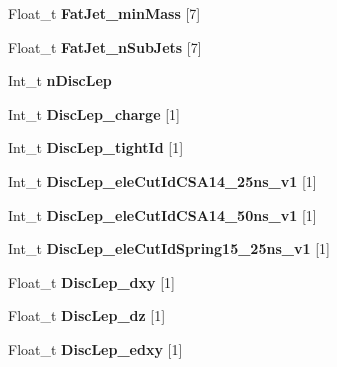 \begin{DoxyCompactItemize}
\item 
\hypertarget{classMiniTree_aec3ee6ef1b918c09efca6d8c4109e689}{}\label{classMiniTree_aec3ee6ef1b918c09efca6d8c4109e689} 
Float\+\_\+t {\bfseries Fat\+Jet\+\_\+min\+Mass} \mbox{[}7\mbox{]}
\item 
\hypertarget{classMiniTree_a91a8f132559198dd2bebf83e5375f74e}{}\label{classMiniTree_a91a8f132559198dd2bebf83e5375f74e} 
Float\+\_\+t {\bfseries Fat\+Jet\+\_\+n\+Sub\+Jets} \mbox{[}7\mbox{]}
\item 
\hypertarget{classMiniTree_ae53bcce460683fbea315c921c406cf20}{}\label{classMiniTree_ae53bcce460683fbea315c921c406cf20} 
Int\+\_\+t {\bfseries n\+Disc\+Lep}
\item 
\hypertarget{classMiniTree_aa75de1036cc5169cd863951a0d14f6b1}{}\label{classMiniTree_aa75de1036cc5169cd863951a0d14f6b1} 
Int\+\_\+t {\bfseries Disc\+Lep\+\_\+charge} \mbox{[}1\mbox{]}
\item 
\hypertarget{classMiniTree_a6d3ac314e8e45330fda3ad611f99657e}{}\label{classMiniTree_a6d3ac314e8e45330fda3ad611f99657e} 
Int\+\_\+t {\bfseries Disc\+Lep\+\_\+tight\+Id} \mbox{[}1\mbox{]}
\item 
\hypertarget{classMiniTree_a1526fb984f752b892240eba71ca71c19}{}\label{classMiniTree_a1526fb984f752b892240eba71ca71c19} 
Int\+\_\+t {\bfseries Disc\+Lep\+\_\+ele\+Cut\+Id\+C\+S\+A14\+\_\+25ns\+\_\+v1} \mbox{[}1\mbox{]}
\item 
\hypertarget{classMiniTree_a1bf9b2363a62e48194d76ed4f294b653}{}\label{classMiniTree_a1bf9b2363a62e48194d76ed4f294b653} 
Int\+\_\+t {\bfseries Disc\+Lep\+\_\+ele\+Cut\+Id\+C\+S\+A14\+\_\+50ns\+\_\+v1} \mbox{[}1\mbox{]}
\item 
\hypertarget{classMiniTree_a44b52053a4a8a64e7743fc4fea5e8c53}{}\label{classMiniTree_a44b52053a4a8a64e7743fc4fea5e8c53} 
Int\+\_\+t {\bfseries Disc\+Lep\+\_\+ele\+Cut\+Id\+Spring15\+\_\+25ns\+\_\+v1} \mbox{[}1\mbox{]}
\item 
\hypertarget{classMiniTree_ab81d0c24c1d4a6a9c24ef799b868b965}{}\label{classMiniTree_ab81d0c24c1d4a6a9c24ef799b868b965} 
Float\+\_\+t {\bfseries Disc\+Lep\+\_\+dxy} \mbox{[}1\mbox{]}
\item 
\hypertarget{classMiniTree_a48304d654d38f6fd9ab572ae630fde3d}{}\label{classMiniTree_a48304d654d38f6fd9ab572ae630fde3d} 
Float\+\_\+t {\bfseries Disc\+Lep\+\_\+dz} \mbox{[}1\mbox{]}
\item 
\hypertarget{classMiniTree_a59468969b4a22daf44d9839f49552557}{}\label{classMiniTree_a59468969b4a22daf44d9839f49552557} 
Float\+\_\+t {\bfseries Disc\+Lep\+\_\+edxy} \mbox{[}1\mbox{]}

\end{DoxyCompactItemize}
